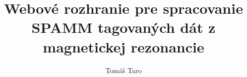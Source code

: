 \title{Webové rozhranie pre spracovanie SPAMM tagovaných dát z magnetickej rezonancie}
\author{Tomáš Taro}
\acknowledgements{}
\abstractCS{}
\abstractEN{}
\keywordsCS{}
\keywordsEN{}
